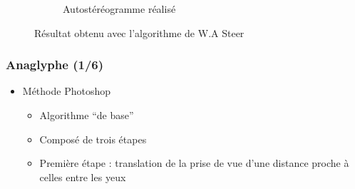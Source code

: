 \documentclass{beamer}
\begin{document}
\begin{frame}
\begin{figure}
\begin{subfigure}{.4\textwidth}
  \caption{Autostéréogramme réalisé}
\end{subfigure}
\caption{Résultat obtenu avec l'algorithme de W.A Steer}
\end{figure}

\end{frame}

%

\begin{frame}
\frametitle{Anaglyphe (1/6)}
\begin{itemize}[label=$\bullet$]
\item Méthode Photoshop \cite{stereoAnaglyph}
	\begin{itemize}[label=$\circ$]
	\item Algorithme ``de base''
	\item Composé de trois étapes 
	\item Première étape : translation de la prise de vue d'une distance proche à celles entre les yeux 
	\end{itemize}
\end{itemize}


\end{frame}
\end{document}
